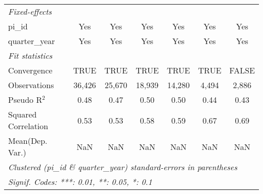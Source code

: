 \begin{tabular}{lcccccc}
   \midrule
   \emph{Fixed-effects}\\
   pi\_id                                                     & Yes            & Yes            & Yes            & Yes            & Yes           & Yes\\  
   quarter\_year                                              & Yes            & Yes            & Yes            & Yes            & Yes           & Yes\\  
   \midrule
   \emph{Fit statistics}\\
   Convergence                                                &TRUE            & TRUE           & TRUE           & TRUE           & TRUE          & FALSE\\  
   Observations                                               & 36,426         & 25,670         & 18,939         & 14,280         & 4,494         & 2,886\\  
   Pseudo R$^2$                                               & 0.48           & 0.47           & 0.50           & 0.50           & 0.44          & 0.43\\  
   Squared Correlation                                        & 0.53           & 0.53           & 0.58           & 0.59           & 0.67          & 0.69\\  
Mean(Dep. Var.) & NaN & NaN & NaN & NaN & NaN & NaN \\
   \midrule \midrule
   \multicolumn{7}{l}{\emph{Clustered (pi\_id \& quarter\_year) standard-errors in parentheses}}\\
   \multicolumn{7}{l}{\emph{Signif. Codes: ***: 0.01, **: 0.05, *: 0.1}}\\
\end{tabular}
\par\endgroup
